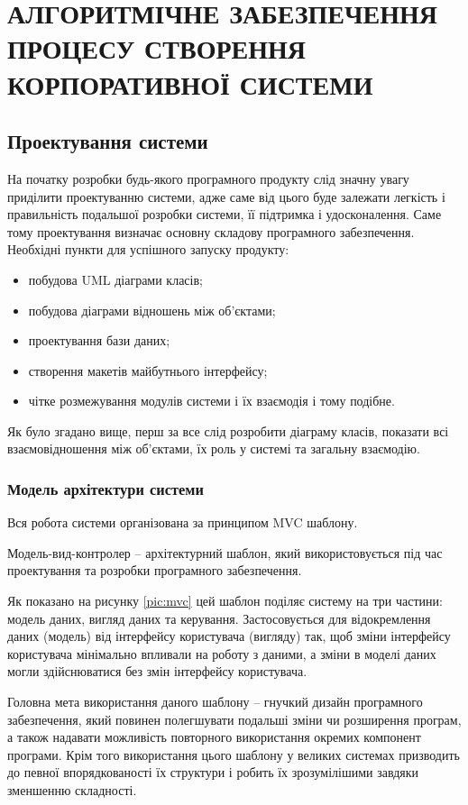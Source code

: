 \section{АЛГОРИТМІЧНЕ ЗАБЕЗПЕЧЕННЯ ПРОЦЕСУ СТВОРЕННЯ КОРПОРАТИВНОЇ СИСТЕМИ}

\subsection{Проектування системи}
На початку розробки будь-якого програмного продукту слід значну увагу приділити проектуванню системи, адже саме від цього буде залежати легкість і правильність подальшої розробки системи, її підтримка і удосконалення.
Саме тому проектування визначає основну складову програмного забезпечення. 
Необхідні пункти для успішного запуску  продукту:
\begin{itemize}
	\item побудова UML діаграми класів;
	\item побудова діаграми відношень між об'єктами;
	\item проектування бази даних;
	\item створення макетів майбутнього інтерфейсу;
	\item чітке розмежування модулів системи і їх взаємодія і тому подібне.
\end{itemize}

\par Як було згадано вище, перш за все слід розробити діаграму класів, показати всі взаємовідношення між об'єктами, їх роль у системі та загальну взаємодію.
\subsubsection{Модель архітектури системи}
Вся робота системи організована за принципом MVC шаблону.
\par Модель-вид-контролер -- архітектурний шаблон, який використовується під час проектування та розробки програмного забезпечення.
\par Як показано на рисунку \ref{pic:mvc} цей шаблон поділяє систему на три частини: модель даних, вигляд даних та керування. Застосовується для відокремлення даних (модель) від інтерфейсу користувача (вигляду) так, щоб зміни інтерфейсу користувача мінімально впливали на роботу з даними, а зміни в моделі даних могли здійснюватися без змін інтерфейсу користувача.

\par Головна мета використання даного шаблону -- гнучкий дизайн програмного забезпечення, який повинен полегшувати подальші зміни чи розширення програм, а також надавати можливість повторного використання окремих компонент програми. 
Крім того використання цього шаблону у великих системах призводить до певної впорядкованості їх структури і робить їх зрозумілішими завдяки зменшенню складності.

